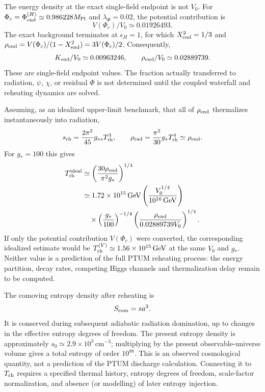 \documentclass[epj]{svjour}
\begin{document}
The energy density at the exact single-field endpoint is not
$V_0$. For $\Phi_c=\Phi_{\rm end}^{(H)}
\simeq0.986228M_{\rm Pl}$ and $\lambda_\Phi=0.02$, the potential
contribution is
\begin{equation}
V(\Phi_c)/V_0\simeq0.01926493.
\end{equation}
The exact background terminates at $\epsilon_H=1$, for which
$X_{\rm end}^2=1/3$ and
$\rho_{\rm end}=V(\Phi_c)/(1-X_{\rm end}^2)=3V(\Phi_c)/2$.
Consequently,
\begin{equation}
K_{\rm end}/V_0\simeq0.00963246,\qquad
\rho_{\rm end}/V_0\simeq0.02889739.
\end{equation}
These are single-field endpoint values. The fraction actually
transferred to radiation, $\psi$, $\chi$, or residual $\Phi$ is not
determined until the coupled waterfall and reheating dynamics are
solved.

Assuming, as an idealized upper-limit benchmark, that all of
$\rho_{\rm end}$ thermalizes instantaneously into radiation,
\begin{equation}
s_{\rm rh}=\frac{2\pi^2}{45}g_{*s}T_{\rm rh}^3,
\qquad
\rho_{\rm rad}=\frac{\pi^2}{30}g_*T_{\rm rh}^4
\simeq\rho_{\rm end}.
\end{equation}
For $g_*=100$ this gives
\begin{align}
T_{\rm rh}^{\rm ideal}
&\simeq
\left(\frac{30\rho_{\rm end}}{\pi^2g_*}\right)^{1/4}
\nonumber\\
&\simeq1.72\times10^{15}\,\mathrm{GeV}
\left(\frac{V_0^{1/4}}{10^{16}\,\mathrm{GeV}}\right)
\nonumber\\
&\quad\times
\left(\frac{g_*}{100}\right)^{-1/4}
\left(\frac{\rho_{\rm end}}{0.02889739V_0}\right)^{1/4}.
\end{align}
If only the potential contribution $V(\Phi_c)$ were converted,
the corresponding idealized estimate would be
$T_{\rm rh}^{(V)}\simeq1.56\times10^{15}\,\mathrm{GeV}$ at the same
$V_0$ and $g_*$. Neither value is a prediction of the full PTUM
reheating process: the energy partition, decay rates, competing
Higgs channels and thermalization delay remain to be computed.

The comoving entropy density after reheating is
\begin{equation}
S_{\rm com}=s a^3.
\end{equation}
It is conserved during subsequent adiabatic radiation domination,
up to changes in the effective entropy degrees of freedom. The
present entropy density is approximately
$s_0\simeq2.9\times10^3\,\mathrm{cm}^{-3}$; multiplying by the
present observable-universe volume gives a total entropy of order
$10^{88}$. This is an observed cosmological quantity, not a
prediction of the PTUM discharge calculation. Connecting it to
$T_{\rm rh}$ requires a specified thermal history, entropy degrees
of freedom, scale-factor normalization, and absence (or modelling)
of later entropy injection.
\end{document}
